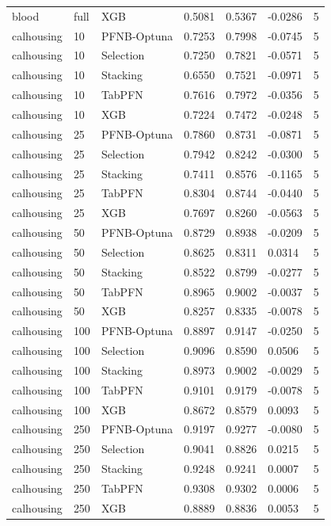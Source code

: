 \begin{tabular}{llllllr}
blood & full & XGB & 0.5081 & 0.5367 & -0.0286 & 5 \\
calhousing & 10 & PFNB-Optuna & 0.7253 & 0.7998 & -0.0745 & 5 \\
calhousing & 10 & Selection & 0.7250 & 0.7821 & -0.0571 & 5 \\
calhousing & 10 & Stacking & 0.6550 & 0.7521 & -0.0971 & 5 \\
calhousing & 10 & TabPFN & 0.7616 & 0.7972 & -0.0356 & 5 \\
calhousing & 10 & XGB & 0.7224 & 0.7472 & -0.0248 & 5 \\
calhousing & 25 & PFNB-Optuna & 0.7860 & 0.8731 & -0.0871 & 5 \\
calhousing & 25 & Selection & 0.7942 & 0.8242 & -0.0300 & 5 \\
calhousing & 25 & Stacking & 0.7411 & 0.8576 & -0.1165 & 5 \\
calhousing & 25 & TabPFN & 0.8304 & 0.8744 & -0.0440 & 5 \\
calhousing & 25 & XGB & 0.7697 & 0.8260 & -0.0563 & 5 \\
calhousing & 50 & PFNB-Optuna & 0.8729 & 0.8938 & -0.0209 & 5 \\
calhousing & 50 & Selection & 0.8625 & 0.8311 & 0.0314 & 5 \\
calhousing & 50 & Stacking & 0.8522 & 0.8799 & -0.0277 & 5 \\
calhousing & 50 & TabPFN & 0.8965 & 0.9002 & -0.0037 & 5 \\
calhousing & 50 & XGB & 0.8257 & 0.8335 & -0.0078 & 5 \\
calhousing & 100 & PFNB-Optuna & 0.8897 & 0.9147 & -0.0250 & 5 \\
calhousing & 100 & Selection & 0.9096 & 0.8590 & 0.0506 & 5 \\
calhousing & 100 & Stacking & 0.8973 & 0.9002 & -0.0029 & 5 \\
calhousing & 100 & TabPFN & 0.9101 & 0.9179 & -0.0078 & 5 \\
calhousing & 100 & XGB & 0.8672 & 0.8579 & 0.0093 & 5 \\
calhousing & 250 & PFNB-Optuna & 0.9197 & 0.9277 & -0.0080 & 5 \\
calhousing & 250 & Selection & 0.9041 & 0.8826 & 0.0215 & 5 \\
calhousing & 250 & Stacking & 0.9248 & 0.9241 & 0.0007 & 5 \\
calhousing & 250 & TabPFN & 0.9308 & 0.9302 & 0.0006 & 5 \\
calhousing & 250 & XGB & 0.8889 & 0.8836 & 0.0053 & 5 \\

\end{tabular}
